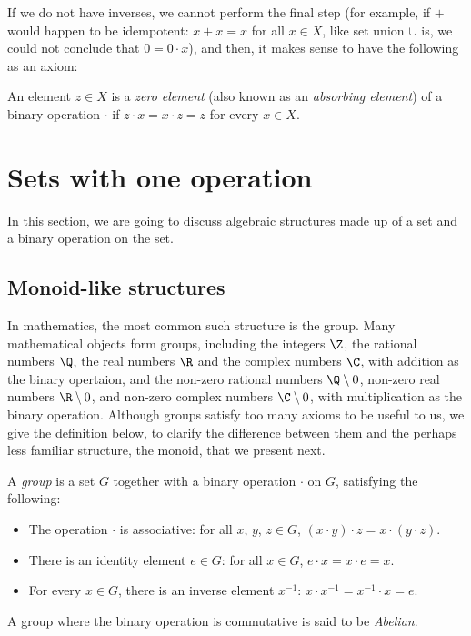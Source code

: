 If we do not have inverses, we cannot perform the final step (for example, if $+$ would happen to be idempotent: $x + x = x$ for all $x \in X$, like set union $\cup$ is, we could not conclude that $0 = 0 \cdot x$), and then, it makes sense to have the following as an axiom:
\begin{Definition}
  An element $z \in X$ is a \emph{zero element} (also known as an \emph{absorbing element}) of a binary operation $\cdot$ if $z \cdot x = x \cdot z = z$ for every $x \in X$.
\end{Definition}

\section{Sets with one operation} %
\label{Set-with-one-op}
In this section, we are going to discuss algebraic structures made up of a set and a binary operation on the set.
\subsection{Monoid-like structures}
In mathematics, the most common such structure is the group. Many mathematical objects form groups, including the integers $\Z$, the rational numbers $\Q$, the real numbers $\R$ and the complex numbers $\C$, with addition as the binary opertaion, and the non-zero rational numbers $\Q\setminus{0}$, non-zero real numbers $\R\setminus{0}$, and non-zero complex numbers $\C\setminus{0}$, with multiplication as the binary operation. Although groups satisfy too many axioms to be useful to us, we give the definition below, to clarify the difference between them and the perhaps less familiar structure, the monoid, that we present next.
\begin{Definition}
A \emph{group} is a set $G$ together with a binary operation $\cdot$ on $G$, satisfying the following:
\begin{itemize}
\item The operation $\cdot$ is associative: for all $x$, $y$, $z \in G$, $(x \cdot y) \cdot z = x \cdot (y \cdot z)$. 
\item There is an identity element $e \in G$: for all $x \in G$, $e \cdot x = x \cdot e = x$.
\item For every $x \in G$, there is an inverse element $x^{-1}$: $x \cdot x^{-1} = x^{-1} \cdot x = e$.
\end{itemize}
A group where the binary operation is commutative is said to be \emph{Abelian}.
\end{Definition}


